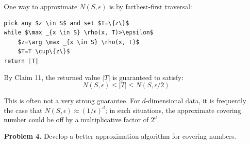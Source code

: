 \documentclass{article}
\begin{document}
One way to approximate $N(S, \epsilon)$ is by farthest-first traversal:

\begin{verbatim}
pick any $z \in S$ and set $T=\{z\}$
while $\max _{x \in S} \rho(x, T)>\epsilon$
    $z=\arg \max _{x \in S} \rho(x, T)$
    $T=T \cup\{z\}$
return |T|
\end{verbatim}

By Claim 11, the returned value $|T|$ is guaranteed to satisfy:
\begin{equation*}
N(S, \epsilon) \leq|T| \leq N(S, \epsilon / 2)
\end{equation*}

This is often not a very strong guarantee. For $d$-dimensional data, it is frequently the case that $N(S, \epsilon) \approx (1 / \epsilon)^{d}$; in such situations, the approximate covering number could be off by a multiplicative factor of $2^{d}$.

\textbf{Problem 4.} Develop a better approximation algorithm for covering numbers.
\end{document}
